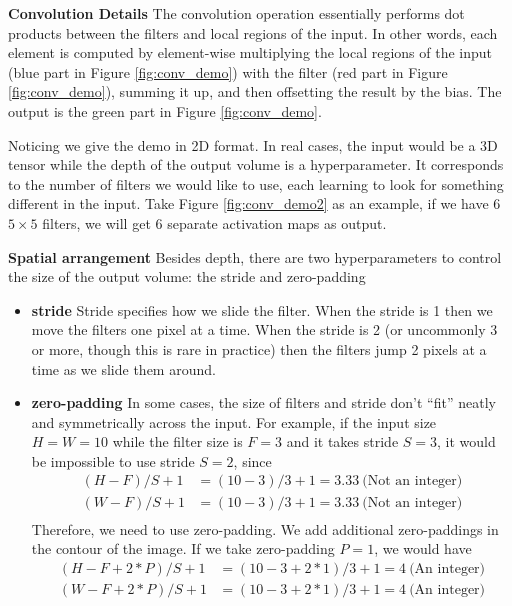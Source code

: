 \documentclass[twoside]{article}
\begin{document}
\textbf{Convolution Details}
The convolution operation essentially performs dot products between the filters and local regions of the input. In other words, each element is computed by element-wise multiplying the local regions of the input (blue part in Figure \ref{fig:conv_demo}) with the filter (red part in Figure \ref{fig:conv_demo}), summing it up, and then offsetting the result by the bias. The output is the green part in Figure \ref{fig:conv_demo}.

Noticing we give the demo in 2D format. In real cases, the input would be a 3D tensor while the depth of the output volume is a hyperparameter. It corresponds to the number of filters we would like to use, each learning to look for something different in the input. Take Figure \ref{fig:conv_demo2} as an example, if we have 6 $5\times5$ filters, we will get 6 separate activation maps as output.

\textbf{Spatial arrangement} Besides depth, there are two hyperparameters to control the size of the output volume: the stride and zero-padding
\begin{itemize}
\item \textbf{stride} Stride specifies how we slide the filter. When the stride is 1 then we move the filters one pixel at a time. When the stride is 2 (or uncommonly 3 or more, though this is rare in practice) then the filters jump 2 pixels at a time as we slide them around.
\item \textbf{zero-padding} In some cases, the size of filters and stride don’t “fit” neatly and symmetrically across the input. For example, if the input size $H=W=10$ while the filter size is $F=3$ and it takes stride $S=3$, it would be impossible to use stride $S=2$, since
\begin{equation}
\begin{aligned}
(H-F)/S+1&=(10-3)/3+1=3.33~\text{(Not an integer)}\\
(W-F)/S+1&=(10-3)/3+1=3.33~\text{(Not an integer)}\\
\end{aligned}
\end{equation}
Therefore, we need to use zero-padding. We add additional zero-paddings in the contour of the image. If we take zero-padding $P=1$, we would have
\begin{equation}
\begin{aligned}
(H-F+2*P)/S+1&=(10-3+2*1)/3+1=4~\text{(An integer)}\\
(W-F+2*P)/S+1&=(10-3+2*1)/3+1=4~\text{(An integer)}\\
\end{aligned}
\end{equation}
\end{itemize}
\end{document}
